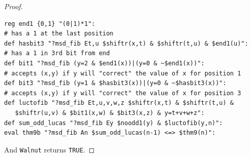 \documentclass[10pt,a4paper]{amsart}
\begin{document}
\begin{proof}
\begin{verbatim}
reg end1 {0,1} "(0|1)*1":
# has a 1 at the last position
def hasbit3 "?msd_fib Et,u $shiftr(x,t) & $shiftr(t,u) & $end1(u)":
# has a 1 in 3rd bit from end
def bit1 "?msd_fib (y=2 & $end1(x))|(y=0 & ~$end1(x))":
# accepts (x,y) if y will "correct" the value of x for position 1
def bit3 "?msd_fib (y=1 & $hasbit3(x))|(y=0 & ~$hasbit3(x))":
# accepts (x,y) if y will "correct" the value of x for position 3
def luctofib "?msd_fib Et,u,v,w,z $shiftr(x,t) & $shiftr(t,u) & 
   $shiftr(u,v) & $bit1(x,w) & $bit3(x,z) & y=t+v+w+z":
def sum_odd_lucas "?msd_fib Ey $noodd1(y) & $luctofib(y,n)":
eval thm9b "?msd_fib An $sum_odd_lucas(n-1) <=> $thm9(n)":
\end{verbatim}
And {\tt Walnut} returns {\tt TRUE}.
\end{proof}
\end{document}
